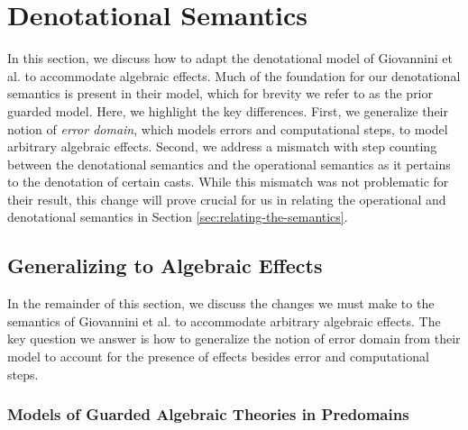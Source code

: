 \documentclass[acmsmall,screen,review,anonymous]{acmart}
\theoremstyle{remark}
\begin{document}

\section{Denotational Semantics}\label{sec:denotational-semantics}

In this section, we discuss how to adapt the denotational model of Giovannini et
al. \cite{gtt-sgdt} to accommodate algebraic effects. Much of the foundation for
our denotational semantics is present in their model, which for brevity we refer
to as the prior guarded model. Here, we highlight the key differences. First, we
generalize their notion of \emph{error domain}, which models errors and
computational steps, to model arbitrary algebraic effects. Second, we address a
mismatch with step counting between the denotational semantics and the
operational semantics as it pertains to the denotation of certain casts. While
this mismatch was not problematic for their result, this change will prove
crucial for us in relating the operational and denotational semantics in Section
\ref{sec:relating-the-semantics}.


\subsection{Generalizing to Algebraic Effects}

In the remainder of this section, we discuss the changes we must make to the
semantics of Giovannini et al. to accommodate arbitrary algebraic effects. The
key question we answer is how to generalize the notion of error domain from
their model to account for the presence of effects besides error and
computational steps.

\subsubsection{Models of Guarded Algebraic Theories in Predomains}
\end{document}
